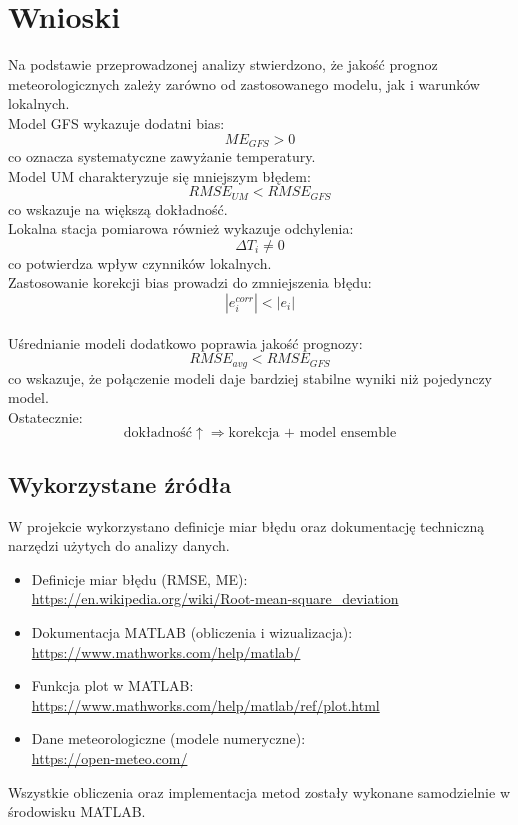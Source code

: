 \documentclass[a4paper,12pt]{article}
\begin{document}
\section{Wnioski}

Na podstawie przeprowadzonej analizy stwierdzono, że jakość prognoz meteorologicznych zależy zarówno od zastosowanego modelu, jak i warunków lokalnych.
\\

\noindent
Model GFS wykazuje dodatni bias:
\[
ME_{GFS} > 0
\]
co oznacza systematyczne zawyżanie temperatury.
\\

\noindent
Model UM charakteryzuje się mniejszym błędem:
\[
RMSE_{UM} < RMSE_{GFS}
\]
co wskazuje na większą dokładność.
\\

\noindent
Lokalna stacja pomiarowa również wykazuje odchylenia:
\[
\Delta T_i \neq 0
\]
co potwierdza wpływ czynników lokalnych.
\\

\noindent
Zastosowanie korekcji bias prowadzi do zmniejszenia błędu:
\[
|e_i^{corr}| < |e_i|
\]
\\

\noindent
Uśrednianie modeli dodatkowo poprawia jakość prognozy:
\[
RMSE_{avg} < RMSE_{GFS}
\]
co wskazuje, że połączenie modeli daje bardziej stabilne wyniki niż pojedynczy model.
\\

\noindent
Ostatecznie:
\[
\text{dokładność} \uparrow \Rightarrow \text{korekcja + model ensemble}
\]

\subsection{Wykorzystane źródła}

W projekcie wykorzystano definicje miar błędu oraz dokumentację techniczną narzędzi użytych do analizy danych.

\begin{itemize}
    \item Definicje miar błędu (RMSE, ME): \\
    \url{https://en.wikipedia.org/wiki/Root-mean-square_deviation}

    \item Dokumentacja MATLAB (obliczenia i wizualizacja): \\
    \url{https://www.mathworks.com/help/matlab/}

    \item Funkcja plot w MATLAB: \\
    \url{https://www.mathworks.com/help/matlab/ref/plot.html}

    \item Dane meteorologiczne (modele numeryczne): \\
    \url{https://open-meteo.com/}
\end{itemize}
\noindent
Wszystkie obliczenia oraz implementacja metod zostały wykonane samodzielnie w środowisku MATLAB.
\end{document}
